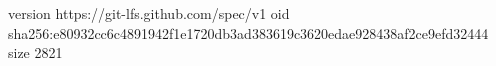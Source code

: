 version https://git-lfs.github.com/spec/v1
oid sha256:e80932cc6c4891942f1e1720db3ad383619c3620edae928438af2ce9efd32444
size 2821
